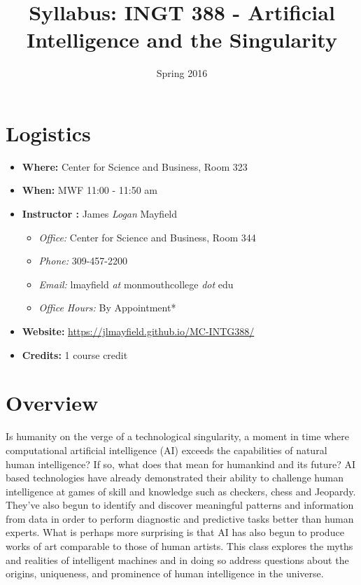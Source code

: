 \documentclass[nobib]{tufte-handout}
\title{Syllabus: INGT 388 - Artificial Intelligence and the Singularity}
\author{}
\date{ Spring 2016 }
\begin{document}
\maketitle

\section{Logistics}
\begin{itemize}
\item \textbf{Where: } Center for Science and Business, Room 323
\item \textbf{When: } MWF 11:00 - 11:50 am
\item \textbf{Instructor :} James \textit{Logan} Mayfield
\begin{itemize}
\item \textit{Office: } Center for Science and Business, Room 344
\item \textit{Phone: } 309-457-2200
\item \textit{Email: } lmayfield \textit{at} monmouthcollege \textit{dot} edu
\item \textit{Office Hours: } By Appointment*
\end{itemize}
\item \textbf{Website: } \url{https://jlmayfield.github.io/MC-INTG388/}
\item \textbf{Credits: } 1 course credit
\end{itemize}

\section{Overview}

Is humanity on the verge of a technological singularity, a moment in time where computational artificial intelligence (AI) exceeds the capabilities of natural human intelligence?  If so, what does that mean for humankind and its future? AI based technologies have already demonstrated their ability to challenge human intelligence at games of skill and knowledge such as checkers, chess and Jeopardy. They've also begun to identify and discover meaningful patterns and information from data in order to perform diagnostic and predictive tasks better than human experts.  What is perhaps more surprising is that AI has also begun to produce works of art comparable to those of human artists. This class explores the myths and realities of intelligent machines and in doing so address questions about the origins, uniqueness, and prominence of human intelligence in the universe.     
\end{document}
